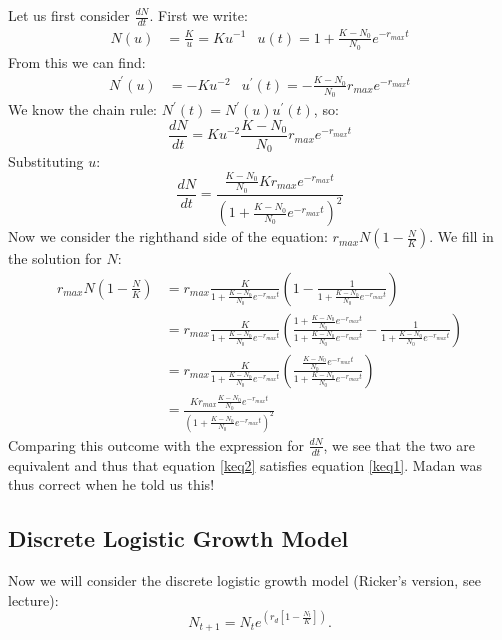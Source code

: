\documentclass{article}\usepackage[]{graphicx}\usepackage[]{color}
\begin{document}
\begin{Answer}[ref=kloge1]
Let us first consider $\frac{dN}{dt}$. First we write:
\begin{align*}
N(u) &= \frac{K}{u} = Ku^{-1} & u(t) = 1+\frac{K-N_0}{N_0}e^{-r_{max}t}
\end{align*}
From this we can find:
\begin{align*}
N^\prime(u) &= - K u^{-2} & u^\prime(t) = -\frac{K-N_0}{N_0}r_{max}e^{-r_{max}t} 
\end{align*}
We know the chain rule: $N^\prime(t) = N^\prime(u) u^\prime(t)$, so:
\begin{equation*}
\frac{dN}{dt} = K u^{-2} \frac{K-N_0}{N_0}r_{max}e^{-r_{max}t} 
\end{equation*}
Substituting $u$:
\begin{equation*}
\frac{dN}{dt} = \frac{\frac{K-N_0}{N_0} K r_{max}e^{-r_{max}t}}{(1+\frac{K-N_0}{N_0}e^{-r_{max}t})^{2}} 
\end{equation*}
Now we consider the righthand side of the equation: $r_{max} N \left( 1-\frac{N}{K}\right) $. We fill in the solution for $N$:
\begin{align*}
r_{max} N \left( 1-\frac{N}{K}\right) &= r_{max} \frac{K}{1+\frac{K-N_0}{N_0}e^{-r_{max}t}} \left( 1-\frac{1}{1+\frac{K-N_0}{N_0}e^{-r_{max}t}}\right) \\ &= r_{max} \frac{K}{1+\frac{K-N_0}{N_0}e^{-r_{max}t}} \left( \frac{1+\frac{K-N_0}{N_0}e^{-r_{max}t}}{1+\frac{K-N_0}{N_0}e^{-r_{max}t}}-\frac{1}{1+\frac{K-N_0}{N_0}e^{-r_{max}t}}\right)\\ &= r_{max} \frac{K}{1+\frac{K-N_0}{N_0}e^{-r_{max}t}} \left( \frac{\frac{K-N_0}{N_0}e^{-r_{max}t}}{1+\frac{K-N_0}{N_0}e^{-r_{max}t}}\right)\\ &= \frac{K r_{max}\frac{K-N_0}{N_0}e^{-r_{max}t}}{(1+\frac{K-N_0}{N_0}e^{-r_{max}t})^2}
\end{align*}
Comparing this outcome with the expression for $\frac{dN}{dt}$, we see that the two are equivalent and thus that equation \ref{keq2} satisfies equation \ref{keq1}. Madan was thus correct when he told us this!
\vspace{1.5ex}
\end{Answer}
\subsection{Discrete Logistic Growth Model}
Now we will consider the discrete logistic growth model (Ricker's version, see lecture):
\begin{equation}
N_{t+1} = N_t e^{\left(r_{d}\left[1-\frac{N_t}{K}\right]\right)}.
\end{equation}
\end{document}
